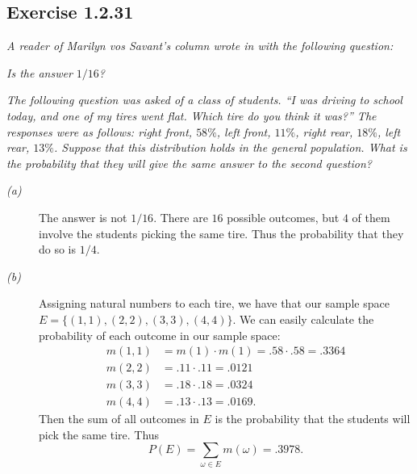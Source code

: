 \documentclass{tufte-handout}
\begin{document}
\subsection{Exercise 1.2.31}

\begin{description}
\item \textit{A reader of Marilyn vos Savant's column wrote in with
    the following question: }
\item[(a)] \textit{Is the answer $1/16$?}
\item[(b)] \textit{The following question was asked of a class of
    students. ``I was driving to school today, and one of my tires
    went flat. Which tire do you think it was?'' The responses were as
    follows: right front, $58\%$, left front, $11\%$, right rear,
    $18\%$, left rear, $13\%$. Suppose that this distribution holds in
    the general population. What is the probability that they will
    give the same answer to the second question?}
\end{description}

\begin{description}
\item[\emph{(a)}] The answer is not $1/16$. There are $16$ possible
  outcomes, but $4$ of them involve the students picking the same
  tire. Thus the probability that they do so is $1/4$.
\item[\emph{(b)}] Assigning natural numbers to each tire, we have that
  our sample space $E = \{(1,1),(2,2),(3,3),(4,4)\}$. We can easily
  calculate the probability of each outcome in our sample space:
  \begin{align*}
    m(1,1) &= m(1) \cdot m(1) = .58 \cdot .58 = .3364\\
    m(2,2) &= .11 \cdot .11 = .0121\\
    m(3,3) &= .18 \cdot .18 = .0324\\
    m(4,4) &= .13 \cdot .13 = .0169.
  \end{align*}
  Then the sum of all outcomes in $E$ is the probability that the
  students will pick the same tire. Thus
  \[P(E) = \sum_{\omega \in E} m(\omega) = .3978.\]
\end{description}
\end{document}
